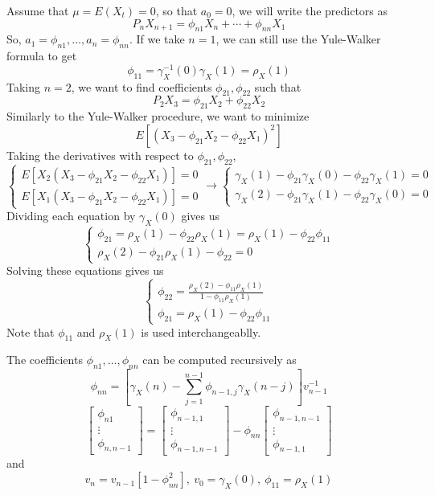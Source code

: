 Assume that $\mu = E(X_t) = 0$, so that $a_0 = 0$, we will write the predictors as 
\[P_nX_{n+1} = \phi_{n1}X_n + \cdots + \phi_{nn}X_1\]
So, $a_1 = \phi_{n1}, \ldots, a_n = \phi_{nn}$. If we take $n=1$, we can still use the Yule-Walker formula to get 
\[\phi_{11} = \gamma_X^{-1}(0)\gamma_X(1) = \rho_X(1)\]
Taking $n=2$, we want to find coefficients $\phi_{21}, \phi_{22}$ such that
\[P_2X_3 = \phi_{21}X_2 + \phi_{22}X_2\]
Similarly to the Yule-Walker procedure, we want to minimize
\[E[(X_3 - \phi_{21}X_2 - \phi_{22}X_1)^2]\]
Taking the derivatives with respect to $\phi_{21}, \phi_{22}$,
\[\begin{cases}
    E[X_2(X_3 - \phi_{21}X_2 - \phi_{22}X_1)] = 0\\
    E[X_1(X_3 - \phi_{21}X_2 - \phi_{22}X_1)] = 0
\end{cases} \rightarrow \begin{cases}
    \gamma_X(1) - \phi_{21}\gamma_X(0) - \phi_{22}\gamma_X(1) = 0\\
    \gamma_X(2) - \phi_{21}\gamma_X(1) - \phi_{22}\gamma_X(0) = 0
\end{cases}\]
Dividing each equation by $\gamma_X(0)$ gives us 
\[\begin{cases}
    \phi_{21} = \rho_X(1) - \phi_{22}\rho_X(1) = \rho_X(1) - \phi_{22}\phi_{11}\\
    \rho_X(2) - \phi_{21}\rho_X(1) - \phi_{22} = 0
\end{cases}\]
Solving these equations gives us 
\[\begin{cases}
    \phi_{22} = \frac{\rho_X(2) - \phi_{11}\rho_X(1)}{1-\phi_{11}\rho_X(1)}\\
    \phi_{21} = \rho_X(1) - \phi_{22}\phi_{11}
\end{cases}\]
Note that $\phi_{11}$ and $\rho_X(1)$ is used interchangeablly.

\begin{theorem}
    The coefficients $\phi_{n1}, \ldots, \phi_{nn}$ can be computed recursively as 
    \[\phi_{nn} = \left[\gamma_X(n) - \sum_{j=1}^{n-1}\phi_{n-1,j}\gamma_X(n-j)\right]v_{n-1}^{-1}\]
    \[\begin{bmatrix}
        \phi_{n1} \\ \vdots \\ \phi_{n,n-1}
    \end{bmatrix} = \begin{bmatrix}
        \phi_{n-1,1}\\ \vdots \\ \phi_{n-1,n-1}
    \end{bmatrix} - \phi_{nn}\begin{bmatrix}
        \phi_{n-1,n-1} \\ \vdots \\ \phi_{n-1,1}
    \end{bmatrix}\]
    and 
    \[v_n = v_{n-1}[1-\phi_{nn}^2], \ v_0 = \gamma_X(0), \ \phi_{11} = \rho_X(1)\]
\end{theorem}

